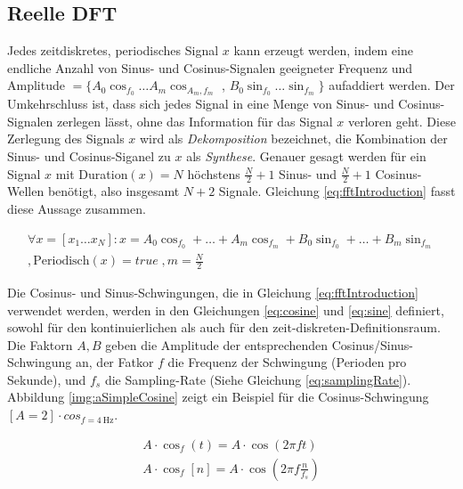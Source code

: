 \subsection{Reelle DFT}
\label{sec:realDFT}

Jedes zeitdiskretes, periodisches Signal $x$ kann erzeugt werden, indem eine endliche Anzahl von Sinus- und Cosinus-Signalen geeigneter Frequenz und Amplitude $ = \{A_0\cos_{f_0} \ldots A_m\cos_{A_m,f_m}$ , $B_0\sin_{f_0} \ldots \sin_{f_m} \}$ aufaddiert werden. Der Umkehrschluss ist, dass sich jedes Signal in eine Menge von Sinus- und Cosinus-Signalen zerlegen lässt, ohne das Information für das Signal $x$ verloren geht. Diese Zerlegung des Signals $x$ wird als \emph{Dekomposition} bezeichnet, die Kombination der Sinus- und Cosinus-Siganel zu $x$ als \emph{Synthese}. Genauer gesagt werden für ein Signal $x$ mit Duration$(x) = N$ höchstens $\frac{N}{2}+1$ Sinus- und $\frac{N}{2}+1$ Cosinus-Wellen benötigt, also insgesamt $N+2$ Signale. Gleichung \ref{eq:fftIntroduction} fasst diese Aussage zusammen. \cite[S. 144 - 147 ]{dspGuide}

\begin{equation}
\label{eq:fftIntroduction}
\begin{split}
\forall x = [x_1 \ldots x_N]: x =  A_0\cos_{f_0} + \ldots + A_m\cos_{f_m}  + B_0\sin_{f_0} + \ldots + B_m \sin_{f_m}  \\
,\text{Periodisch}(x) = true \; ,m = \frac{N}{2}
\end{split}
\end{equation}


Die Cosinus- und Sinus-Schwingungen, die in Gleichung \ref{eq:fftIntroduction} verwendet werden, werden in den Gleichungen \ref{eq:cosine} und \ref{eq:sine} definiert, sowohl für den kontinuierlichen als auch für den zeit-diskreten-Definitionsraum. Die Faktorn $A,B$ geben die Amplitude der entsprechenden Cosinus/Sinus-Schwingung an, der Fatkor $f$ die Frequenz der Schwingung (Perioden pro Sekunde), und $f_s$ die Sampling-Rate (Siehe Gleichung \ref{eq:samplingRate}). \cite[S. 62]{dspMichigan} \cite[S. 150]{dspGuide} Abbildung \ref{img:aSimpleCosine} zeigt ein Beispiel für die Cosinus-Schwingung $[A=2] \cdot cos_{f=\SI{4}{\hertz}}$.

\begin{equation}
\label{eq:cosine}
\begin{gathered}
A \cdot \cos_{f}(t) = A \cdot \cos(2\pi f t) \\
A \cdot \cos_{f}[n]  = A \cdot \cos(2\pi f \frac{n}{f_s})
\end{gathered}
\end{equation}

